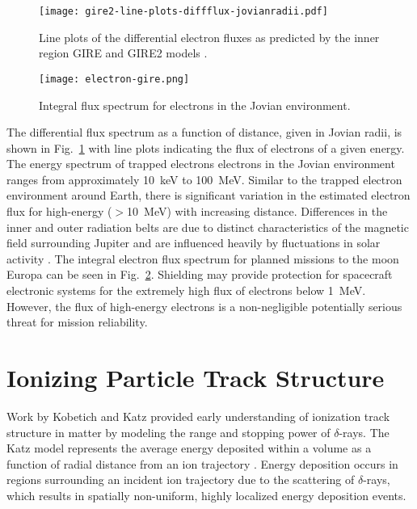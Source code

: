 \begin{figure}[tb]
    \begin{center}
        \texttt{[image: gire2-line-plots-diffflux-jovianradii.pdf]}
    \end{center}
    \caption[Line plots of the differential electron fluxes as predicted by the inner region GIRE and GIRE2 models.]{Line plots of the differential electron fluxes as predicted by the inner region GIRE and GIRE2 models \cite{garrett2012galileo}.}
    \label{fig:gire2-diff-flux}
\end{figure}
\begin{figure}[tb]
    \begin{center}
        \texttt{[image: electron-gire.png]}
    \end{center}
    \caption{Integral flux spectrum for electrons in the Jovian environment.}
    \label{fig:jovian-int-flux-spectrum}
\end{figure}

The differential flux spectrum as a function of distance, given in Jovian radii, is shown in Fig.~\ref{fig:gire2-diff-flux} with line plots indicating the flux of electrons of a given energy.
The energy spectrum of trapped electrons electrons in the Jovian environment ranges from approximately 10~keV to 100~MeV.
Similar to the trapped electron environment around Earth, there is significant variation in the estimated electron flux for high-energy ($>$10~MeV) with increasing distance.
Differences in the inner and outer radiation belts are due to distinct characteristics of the magnetic field surrounding Jupiter and are influenced heavily by fluctuations in solar activity \cite{garrett2012galileo}. 
The integral electron flux spectrum for planned missions to the moon Europa can be seen in Fig.~\ref{fig:jovian-int-flux-spectrum}.
Shielding may provide protection for spacecraft electronic systems for the extremely high flux of electrons below 1~MeV. 
However, the flux of high-energy electrons is a non-negligible potentially serious threat for mission reliability. 



\section{Ionizing Particle Track Structure} %
\label{sec:evaluating_track_structure}
Work by Kobetich \cite{Kobetich:1968im} and Katz \cite{Katz:1968fo} provided early understanding of ionization track structure in matter by modeling the range and stopping power of $\delta$-rays.
The Katz model represents the average energy deposited within a volume as a function of radial distance from an ion trajectory \cite{Chunxiang:1985uo, Fageeha:1994tc, Kobetich:1968im, Katz:1968fo}. 
Energy deposition occurs in regions surrounding an incident ion trajectory due to the scattering of $\delta$-rays, which results in spatially non-uniform, highly localized energy deposition events.

